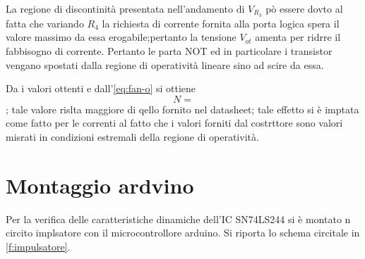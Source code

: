 	La regione di discontinità presentata nell'andamento di $V_{R_{3}}$
	pò essere dovto al fatta che variando $R_{4}$ la richiesta di corrente fornita alla porta logica spera il valore massimo da essa erogabile;pertanto la tensione $V_{ot}$ amenta per ridrre il fabbisogno di corrente.
	Pertanto le parta NOT ed in particolare i transistor vengano spostati dalla regione di operatività lineare sino ad scire da  essa.

	Da i valori ottenti e dall'\eqref{eq:fan-o} si ottiene $$N=$$; tale valore rislta maggiore di qello fornito nel datasheet; tale effetto si è imptata come fatto per le correnti al fatto che i valori forniti dal costrttore sono valori misrati in condizioni estremali della regione di operatività.

\section{Montaggio ardvino}
	Per la verifica delle caratteristiche dinamiche dell'IC SN74LS244 si è montato n circito implsatore con il microcontrollore arduino.
	Si riporta lo schema circitale in \figurename{ \ref{f:impulsatore}}.

